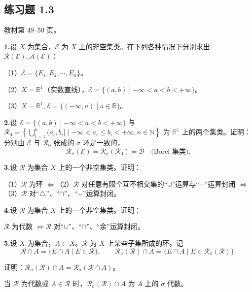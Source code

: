 \documentclass[11pt,a4paper]{article}
\begin{document}
\subsection*{练习题 1.3}
\noindent 教材第 49--50 页。
\par{}\noindent\textbf{1.}\quad 设 $X$ 为集合，$\mathcal E$ 为 $X$ 上的非空集类。在下列各种情况下分别求出 $\mathcal R(\mathcal E),\mathcal A(\mathcal E)$：
\par\noindent （1）$\mathcal E=\{E_1,E_2,\cdots,E_n\}$。
\par\noindent （2）$X=\mathbb R^1$（实数直线），$\mathcal E=\{(a,b)\mid-\infty<a<b<+\infty\}$。
\par\noindent （3）$X=\mathbb R^1,\mathcal E=\{(-\infty,a)\mid a\in\mathbb R\}$。
\par{}\noindent\textbf{2.}\quad 设 $\mathcal E=\{(a,b)\mid-\infty<a<b<+\infty\}$ 与 $\mathcal R_0=\left\{\bigcup_{i=1}^n(a_i,b_i]\mid-\infty<a_i\leq b_i<+\infty,n\in\mathbb N\right\}$ 为 $\mathbb R^1$ 上的两个集类。证明：分别由 $\mathcal E$ 与 $\mathcal R_0$ 张成的 $\sigma$ 环是一致的，
\[\mathcal R_\sigma(\mathcal E)=\mathcal R_\sigma(\mathcal R_0)=\mathcal B\quad\text{(Borel 集类)}.\]
\par{}\noindent\textbf{3.}\quad 设 $\mathcal R$ 为集合 $X$ 上的一个非空集类。证明：
\par\noindent （1）$\mathcal R$ 为环 $\Leftrightarrow$（2）$\mathcal R$ 对任意有限个互不相交集的“$\cup$”运算与“$-$”运算封闭 $\Leftrightarrow$（3）$\mathcal R$ 对“$\triangle$”、“$\cap$”、“$-$”运算封闭。
\par{}\noindent\textbf{4.}\quad 设 $\mathcal R$ 为集合 $X$ 上的一个非空集类。证明：
\par\noindent $\mathcal R$ 为代数 $\Leftrightarrow\mathcal R$ 对“$\cup$”、“$\cap$”、“余”运算封闭。
\par{}\noindent\textbf{5.}\quad 设 $X$ 为集合，$A\subset X$。$\mathcal R$ 为 $X$ 上某些子集所成的环。记
\[\mathcal R\cap A=\{E\cap A\mid E\in\mathcal R\},\qquad \mathcal R_\sigma(\mathcal R)\cap A=\{E\cap A\mid E\in\mathcal R_\sigma(\mathcal R)\}.\]
\par\noindent 证明：$\mathcal R_\sigma(\mathcal R)\cap A=\mathcal R_\sigma(\mathcal R\cap A)$。
\par\noindent 当 $\mathcal R$ 为代数或 $A\in\mathcal R$ 时，$\mathcal R_\sigma(\mathcal R)\cap A$ 为 $A$ 上的 $\sigma$ 代数。
\end{document}
